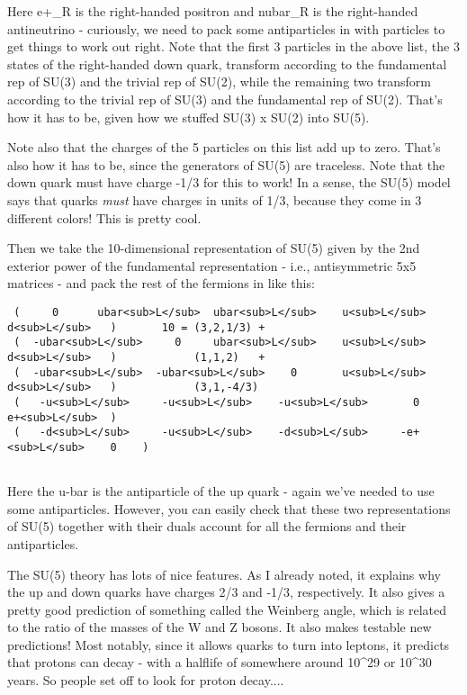 Here e+_{R} is the right-handed positron and nubar_{R} is the right-handed
antineutrino - curiously, we need to pack some antiparticles in with
particles to get things to work out right.  Note that the first 3
particles in the above list, the 3 states of the right-handed down
quark, transform according to the fundamental rep of SU(3) and the
trivial rep of SU(2), while the remaining two transform according to
the trivial rep of SU(3) and the fundamental rep of SU(2).  That's how
it has to be, given how we stuffed SU(3) x SU(2) into SU(5).  

Note also that the charges of the 5 particles on this list add up to
zero.  That's also how it has to be, since the generators of SU(5) are
traceless.  Note that the down quark must have charge -1/3 for this to
work!  In a sense, the SU(5) model says that quarks \emph{must} have
charges in units of 1/3, because they come in 3 different colors!
This is pretty cool.

Then we take the 10-dimensional representation of SU(5) given by
the 2nd exterior power of the fundamental representation - i.e.,
antisymmetric 5x5 matrices - and pack the rest of the fermions in
like this:

\begin{verbatim}
 (     0      ubar<sub>L</sub>  ubar<sub>L</sub>    u<sub>L</sub>    d<sub>L</sub>   )       10 = (3,2,1/3) + 
 (  -ubar<sub>L</sub>     0     ubar<sub>L</sub>    u<sub>L</sub>    d<sub>L</sub>   )            (1,1,2)   +
 (  -ubar<sub>L</sub>  -ubar<sub>L</sub>    0       u<sub>L</sub>    d<sub>L</sub>   )            (3,1,-4/3)
 (   -u<sub>L</sub>     -u<sub>L</sub>    -u<sub>L</sub>       0     e+<sub>L</sub>  )
 (   -d<sub>L</sub>     -u<sub>L</sub>    -d<sub>L</sub>     -e+<sub>L</sub>    0    )
                     
\end{verbatim}
    
Here the u-bar is the antiparticle of the up quark - again we've 
needed to use some antiparticles.  However, you can easily check
that these two representations of SU(5) together with their duals
account for all the fermions and their antiparticles.

The SU(5) theory has lots of nice features.  As I already noted, it
explains why the up and down quarks have charges 2/3 and -1/3,
respectively.  It also gives a pretty good prediction of something
called the Weinberg angle, which is related to the ratio of the masses
of the W and Z bosons.  It also makes testable new predictions!  Most
notably, since it allows quarks to turn into leptons, it predicts that
protons can decay - with a halflife of somewhere around 10^{29} or
10^{30} years.  So people set off to look for proton decay....

